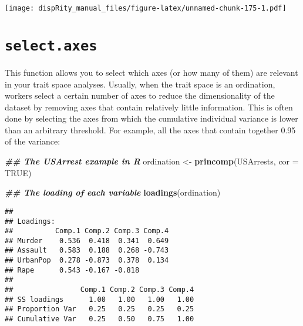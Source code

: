 \documentclass[
]{book}
\newenvironment{Shaded}{\begin{snugshade}}{\end{snugshade}}
\newcommand{\AttributeTok}[1]{\textcolor[rgb]{0.13,0.29,0.53}{#1}}
\newcommand{\ConstantTok}[1]{\textcolor[rgb]{0.56,0.35,0.01}{#1}}
\newcommand{\DecValTok}[1]{\textcolor[rgb]{0.00,0.00,0.81}{#1}}
\newcommand{\DocumentationTok}[1]{\textcolor[rgb]{0.56,0.35,0.01}{\textbf{\textit{#1}}}}
\newcommand{\FunctionTok}[1]{\textcolor[rgb]{0.13,0.29,0.53}{\textbf{#1}}}
\newcommand{\NormalTok}[1]{#1}
\newcommand{\OtherTok}[1]{\textcolor[rgb]{0.56,0.35,0.01}{#1}}
\newcommand{\SpecialCharTok}[1]{\textcolor[rgb]{0.81,0.36,0.00}{\textbf{#1}}}
\begin{document}
\texttt{[image: dispRity\_manual\_files/figure-latex/unnamed-chunk-175-1.pdf]}

\hypertarget{select.axes}{%
\section{\texorpdfstring{\texttt{select.axes}}{select.axes}}\label{select.axes}}

This function allows you to select which axes (or how many of them) are relevant in your trait space analyses.
Usually, when the trait space is an ordination, workers select a certain number of axes to reduce the dimensionality of the dataset by removing axes that contain relatively little information.
This is often done by selecting the axes from which the cumulative individual variance is lower than an arbitrary threshold.
For example, all the axes that contain together 0.95 of the variance:

\begin{Shaded}
\begin{Highlighting}[]
\DocumentationTok{\#\# The USArrest example in R}
\NormalTok{ordination }\OtherTok{\textless{}{-}} \FunctionTok{princomp}\NormalTok{(USArrests, }\AttributeTok{cor =} \ConstantTok{TRUE}\NormalTok{)}

\DocumentationTok{\#\# The loading of each variable}
\FunctionTok{loadings}\NormalTok{(ordination)}
\end{Highlighting}
\end{Shaded}

\begin{verbatim}
## 
## Loadings:
##          Comp.1 Comp.2 Comp.3 Comp.4
## Murder    0.536  0.418  0.341  0.649
## Assault   0.583  0.188  0.268 -0.743
## UrbanPop  0.278 -0.873  0.378  0.134
## Rape      0.543 -0.167 -0.818       
## 
##                Comp.1 Comp.2 Comp.3 Comp.4
## SS loadings      1.00   1.00   1.00   1.00
## Proportion Var   0.25   0.25   0.25   0.25
## Cumulative Var   0.25   0.50   0.75   1.00
\end{verbatim}

\begin{Shaded}
\end{Shaded}
\end{document}
